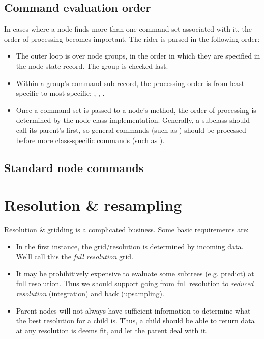 \subsection{Command evaluation order}

  In cases where a node finds more than one command set associated with it, the
  order of processing becomes important. The rider is parsed in the following
  order:

  \begin{itemize}
  
  \item The outer loop is over node groups, in the order in which they are
  specified in the node state record. The  group is checked last.
  
  \item Within a group's command sub-record, the processing order is from least
  specific to most specific: , ,
  .
  
  \item Once a command set is passed to a node's  method,
  the order of processing is determined by the node class implementation.
  Generally, a subclass should call its parent's  first,
  so general commands (such as ) should be processed before
  more class-specific commands (such as ).
  
  \end{itemize}
  
\subsection{Standard node commands}
  
\section{Resolution \& resampling}
\label{sec:resampling}

  Resolution \& gridding is a complicated business. Some basic requirements
  are:

  \begin{itemize}
  
  \item In the first instance, the grid/resolution is determined by incoming
  data. We'll call this the {\em full resolution} grid.

  \item It may be prohibitively expensive to evaluate some subtrees (e.g.
  predict) at full resolution. Thus we should support going from full
  resolution to {\em reduced resolution} (integration) and back (upsampling). 
  
  \item Parent nodes will not always have sufficient information to determine
  what the best resolution for a child is. Thus, a child should be able to 
  return data at any resolution is deems fit, and let the parent deal with it.
  
  \end{itemize}
  
